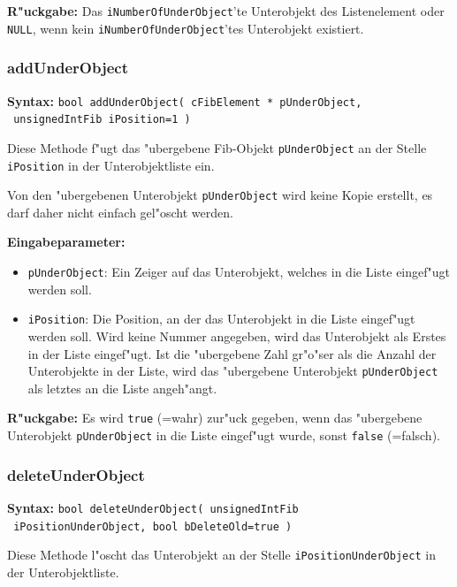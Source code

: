 \bigskip\noindent
\textbf{R"uckgabe:} Das \verb|iNumberOfUnderObject|'te Unterobjekt des Listenelement oder \verb|NULL|, wenn kein \verb|iNumberOfUnderObject|'tes Unterobjekt existiert.


\subsubsection{addUnderObject}

\textbf{Syntax:} \verb|bool addUnderObject( cFibElement * pUnderObject,| \\\verb| unsignedIntFib iPosition=1 )|

\bigskip\noindent
Diese Methode f"ugt das "ubergebene Fib-Objekt \verb|pUnderObject| an der Stelle \verb|iPosition| in der Unterobjektliste ein.

Von den "ubergebenen Unterobjekt \verb|pUnderObject| wird keine Kopie erstellt, es darf daher nicht einfach gel"oscht werden.

\bigskip\noindent
\textbf{Eingabeparameter:}
\begin{itemize}
 \item \verb|pUnderObject|: Ein Zeiger auf das Unterobjekt, welches in die Liste eingef"ugt werden soll.
 \item \verb|iPosition|: Die Position, an der das Unterobjekt in die Liste eingef"ugt werden soll. Wird keine Nummer angegeben, wird das Unterobjekt als Erstes in der Liste eingef"ugt. Ist die "ubergebene Zahl gr"o"ser als die Anzahl der Unterobjekte in der Liste, wird das "ubergebene Unterobjekt \verb|pUnderObject| als letztes an die Liste angeh"angt.
\end{itemize}

\bigskip\noindent
\textbf{R"uckgabe:} Es wird \verb|true| (=wahr) zur"uck gegeben, wenn das "ubergebene Unterobjekt \verb|pUnderObject| in die Liste eingef"ugt wurde, sonst \verb|false| (=falsch).


\subsubsection{deleteUnderObject}

\textbf{Syntax:} \verb|bool deleteUnderObject( unsignedIntFib| \\\verb| iPositionUnderObject, bool bDeleteOld=true )|

\bigskip\noindent
Diese Methode l"oscht das Unterobjekt an der Stelle \verb|iPositionUnderObject| in der Unterobjektliste. 


